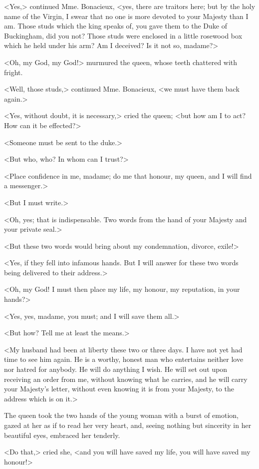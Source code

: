 <Yes,> continued Mme. Bonacieux, <yes, there are traitors here; but by the holy name of the Virgin, I swear that no one is more devoted to your Majesty than I am. Those studs which the king speaks of, you gave them to the Duke of Buckingham, did you not? Those studs were enclosed in a little rosewood box which he held under his arm? Am I deceived? Is it not so, madame?> 

<Oh, my God, my God!> murmured the queen, whose teeth chattered with fright. 

<Well, those studs,> continued Mme. Bonacieux, <we must have them back again.> 

<Yes, without doubt, it is necessary,> cried the queen; <but how am I to act? How can it be effected?> 

<Someone must be sent to the duke.> 

<But who, who? In whom can I trust?> 

<Place confidence in me, madame; do me that honour, my queen, and I will find a messenger.> 

<But I must write.> 

<Oh, yes; that is indispensable. Two words from the hand of your Majesty and your private seal.> 

<But these two words would bring about my condemnation, divorce, exile!> 

<Yes, if they fell into infamous hands. But I will answer for these two words being delivered to their address.> 

<Oh, my God! I must then place my life, my honour, my reputation, in your hands?> 

<Yes, yes, madame, you must; and I will save them all.> 

<But how? Tell me at least the means.> 

<My husband had been at liberty these two or three days. I have not yet had time to see him again. He is a worthy, honest man who entertains neither love nor hatred for anybody. He will do anything I wish. He will set out upon receiving an order from me, without knowing what he carries, and he will carry your Majesty's letter, without even knowing it is from your Majesty, to the address which is on it.> 

The queen took the two hands of the young woman with a burst of emotion, gazed at her as if to read her very heart, and, seeing nothing but sincerity in her beautiful eyes, embraced her tenderly. 

<Do that,> cried she, <and you will have saved my life, you will have saved my honour!> 


